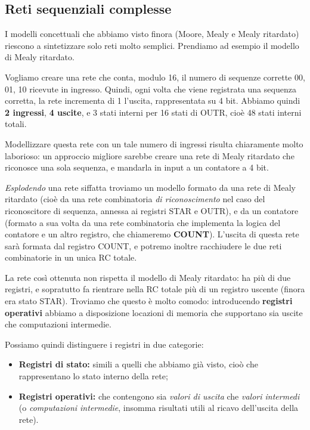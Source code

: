 \documentclass[a4paper,11pt]{article}
\begin{document}
\subsection{Reti sequenziali complesse}
I modelli concettuali che abbiamo visto finora (Moore, Mealy e Mealy ritardato) riescono a sintetizzare solo reti molto semplici.
Prendiamo ad esempio il modello di Mealy ritardato.

Vogliamo creare una rete che conta, modulo 16, il numero di sequenze corrette 00, 01, 10 ricevute in ingresso.
Quindi, ogni volta che viene registrata una sequenza corretta, la rete incrementa di 1 l'uscita, rappresentata su 4 bit.
Abbiamo quindi \textbf{2 ingressi}, \textbf{4 uscite}, e 3 stati interni per 16 stati di OUTR, cioè 48 stati interni totali.

Modellizzare questa rete con un tale numero di ingressi risulta chiaramente molto laborioso: un approccio migliore sarebbe creare una rete di Mealy ritardato che riconosce una sola sequenza, e mandarla in input a un contatore a 4 bit.

\textit{Esplodendo} una rete siffatta troviamo un modello formato da una rete di Mealy ritardato (cioè da una rete combinatoria \textit{di riconoscimento} nel caso del riconoscitore di sequenza, annessa ai registri STAR e OUTR), e da un contatore (formato a sua volta da una rete combinatoria che implementa la logica del contatore e un altro registro, che chiameremo \textbf{COUNT}).
L'uscita di questa rete sarà formata dal registro COUNT, e potremo inoltre racchiudere le due reti combinatorie in un unica RC totale.

La rete così ottenuta non rispetta il modello di Mealy ritardato: ha più di due registri, e sopratutto fa rientrare nella RC totale più di un registro uscente (finora era stato STAR).
Troviamo che questo è molto comodo: introducendo \textbf{registri operativi} abbiamo a disposizione locazioni di memoria che supportano sia uscite che computazioni intermedie.

Possiamo quindi distinguere i registri in due categorie:
\begin{itemize}
	\item \textbf{Registri di stato:} simili a quelli che abbiamo già visto, cioò che rappresentano lo stato interno della rete;
	\item \textbf{Registri operativi:} che contengono sia \textit{valori di uscita} che \textit{valori intermedi} (o \textit{computazioni intermedie}, insomma risultati utili al ricavo dell'uscita della rete). 
\end{itemize}
\end{document}
